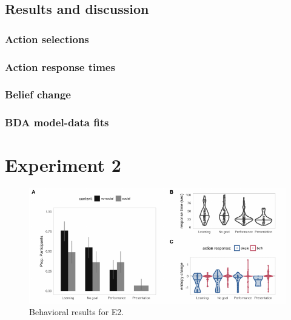 \documentclass[10pt, letterpaper]{article}
\newenvironment{CodeChunk}{}{}
\begin{document}
\subsection{Results and discussion}\label{results-and-discussion}

\subsubsection{Action selections}\label{action-selections}

\subsubsection{Action response times}\label{action-response-times}

\subsubsection{Belief change}\label{belief-change}

\subsubsection{BDA model-data fits}\label{bda-model-data-fits}

\section{Experiment 2}\label{experiment-2}

\begin{CodeChunk}
\begin{figure}[t]

{\centering \includegraphics[width=0.95\linewidth]{figs/e2_behav_results-1} 

}

\caption[Behavioral results for E2]{Behavioral results for E2.}\label{fig:e2_behav_results}
\end{figure}
\end{CodeChunk}
\end{document}
